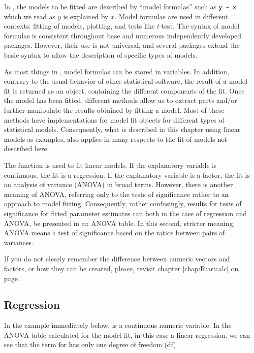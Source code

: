 \documentclass[krantz2]{krantz}\usepackage{knitr}
\begin{document}
In \Rlang, the models to be fitted are described by ``model formulas'' such as \verb|y ~ x| which we read as $y$ is explained by $x$. Model formulas are used in different contexts: fitting of models, plotting, and tests like $t$-test. The syntax of model formulas is consistent throughout base \Rlang and numerous independently developed packages. However, their use is not universal, and several packages extend the basic syntax to allow the description of specific types of models.

As most things in \Rlang, model formulas can be stored in variables. In addition, contrary to the usual behavior of other statistical software, the result of a model fit is returned as an object, containing the different components of the fit. Once the model has been fitted, different methods allow us to extract parts and/or further manipulate the results obtained by fitting a model. Most of these methods have implementations for model fit objects for different types of statistical models. Consequently, what is described in this chapter using linear models as examples, also applies in many respects to the fit of models not described here.

The \Rlang function  is used to fit linear models. If the explanatory variable is continuous, the fit is a regression. If the explanatory variable is a factor, the fit is an analysis of variance (ANOVA) in broad terms. However, there is another meaning of ANOVA, referring only to the tests of significance rather to an approach to model fitting. Consequently, rather confusingly, results for tests of significance for fitted parameter estimates can both in the case of regression and ANOVA, be presented in an ANOVA table. In this second, stricter meaning, ANOVA means a test of significance based on the ratios between pairs of variances.

\begin{warningbox}
If you do not clearly remember the difference between numeric vectors and factors, or how they can be created, please, revisit chapter \ref{chap:R:as:calc} on page \pageref{chap:R:as:calc}.
\end{warningbox}

\subsection{Regression}
In  the example immediately below,  is a continuous numeric variable. In the ANOVA table calculated for the model fit, in this case a linear regression, we can see that the term for  has only one degree of freedom (df).
\end{document}
